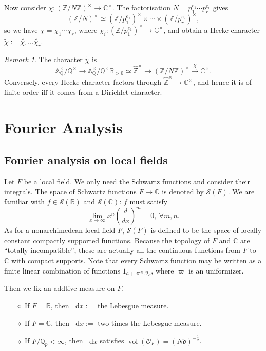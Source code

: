 \documentclass{article}
\theoremstyle{definition}
\theoremstyle{remark}
\newtheorem*{remark}{Remark}
\renewcommand{\tilde}{\widetilde}
\renewcommand{\hat}{\widehat}
\newcommand{\R}{\mathbb{R}}
\newcommand{\C}{\mathbb{C}}
\newcommand{\Q}{\mathbb{Q}}
\newcommand{\Z}{\mathbb{Z}}
\newcommand{\idele}[1]{\mathbb{A}_{#1}^{\times}}
\newcommand{\dx}{\mathop{}\!\mathrm{d}x}
\newcommand{\diff}{\mathfrak{d}}
\renewcommand{\O}{\mathcal{O}}
\DeclareMathOperator{\vol}{vol}
\newcommand{\myit}{$\diamond$}
\begin{document}
Now consider $\chi : (\Z/N\Z)^{\times}\to\C^\times$. The factorisation $N = p_1^{e_1}\cdots p_r^{e_r}$ gives \[(\Z/N)^\times \simeq (\Z/p_1^{e_1})^\times \times\cdots\times(\Z/p_{r}^{e_r})^\times,\]
so we have $\chi = \chi_1\cdots\chi_r$, where $\chi_i : (\Z/p_1^{e_1})^\times\to\C^\times$,
and obtain a Hecke character $\tilde{\chi} := \tilde{\chi_1}\dots\tilde{\chi_r}$.

\begin{remark}
    The character $\tilde{\chi}$ is \[\idele{\Q}/\Q^\times\to\idele{\Q}/\Q^\times\R_{>0}\simeq\hat{\Z}^\times\to (\Z/N\Z)^\times \stackrel{\chi}{\to}\C^\times.\]
    Conversely, every Hecke character factors through $\hat{\Z}^\times\to\C^\times$, and hence it is of finite order iff it comes from a Dirichlet character.
\end{remark}

\section{Fourier Analysis}

\subsection{Fourier analysis on local fields}
Let $F$ be a local field. 
We only need the Schwartz functions and consider their integrals. The space of Schwartz functions $F \to\C$ is denoted by $\mathcal{S}(F)$.
We are familiar with $f\in \mathcal{S}(\R)$ and $\mathcal{S}(\C)$: $f$ must satisfy \[\lim_{x\to\infty}x^n \left( \frac{d}{dx} \right)^m = 0,\ \forall m, n.\]
As for a nonarchimedean local field $F$, $\mathcal{S}(F)$ is defined to be the space of locally constant compactly supported functions. Because the topology of $F$ and $\C$ are ``totally incompatible'', these are actually all the continuous functions from $F$ to $\C$ with compact supports.
Note that every Schwartz function may be written as a finite linear combination of functions $1_{a+\varpi^n\O_F}$, where $\varpi$ is an uniformizer.

Then we fix an addtive measure on $F$.
\begin{enumerate}
    \item [\myit] If $F = \R$, then $\dx := $ the Lebesgue measure.
    \item [\myit] If $F = \C$, then $\dx := $ two-times the Lebesgue measure.
    \item [\myit] If $F/\Q_p<\infty$, then $\dx$ satisfies $\vol(\O_{F}) = (N\diff)^{-\frac{1}{2}}$.
\end{enumerate}
\end{document}
